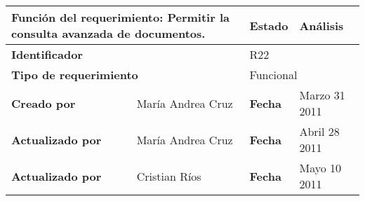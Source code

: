 %
\begin{center}
\begin{longtable}{|p{}|p{}|p{}|p{}|}
\hline
\multicolumn{2}{|p{0.45\textwidth}|}{{\bf {Función del requerimiento:}}
Permitir la consulta avanzada de documentos. } & {\bf{ Estado}} & Análisis \\
\hline
\multicolumn{2}{|p{0.45\textwidth}}{\bf Identificador} &
\multicolumn{2}{|p{0.45\textwidth}|}{R22} \\
\hline
\multicolumn{2}{|p{0.45\textwidth}}{\bf {Tipo de requerimiento}} &
\multicolumn{2}{|p{0.45\textwidth}|}{Funcional}\\
\hline
\bf {Creado por} & María Andrea Cruz & \bf {Fecha  } & Marzo 31 2011\\
\hline
\bf {Actualizado por} & María Andrea Cruz  & \bf {Fecha  }& Abril 28 2011\\
\hline
\bf {Actualizado por} & Cristian Ríos  & \bf {Fecha  }& Mayo 10 2011\\


\end{longtable}
\end{center}
